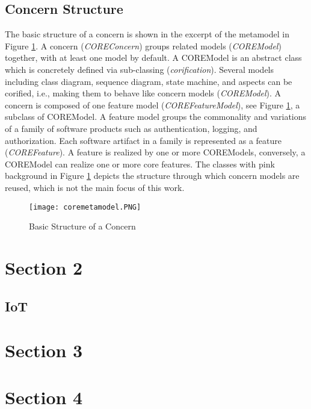\subsection{Concern Structure}
The basic structure of a concern is shown in the excerpt of the metamodel in Figure \ref{fig : core metamodel}. A concern (\textit{COREConcern}) groups related models (\textit{COREModel}) together, with at least one model by default. A COREModel is an abstract class which is concretely defined via sub-classing (\textit{corification}). Several models including class diagram, sequence diagram, state machine, and aspects can be corified, i.e., making them to behave like concern models (\textit{COREModel}).  A concern is composed of one feature model (\textit{COREFeatureModel}), see Figure \ref{fig : core metamodel}, a subclass of COREModel. A feature model groups the commonality and variations of a family of software products such as authentication, logging, and authorization. Each software artifact in a family is represented as a feature (\textit{COREFeature}). A feature is realized by one or more COREModels, conversely, a COREModel can realize one or more core features. The classes with pink background in Figure \ref{fig : core metamodel} depicts the structure through which concern models are reused, which is not the main focus of this work.

\begin{figure}
\texttt{[image: coremetamodel.PNG]}
	\caption{Basic Structure of a Concern}
	\label{fig : core metamodel}
\end{figure}

\section{Section 2}
\label{section2}

  
  
	\subsection{IoT}
	 
	 	 
	 

	
	


\section{Section 3}
\label{section3}


\section{Section 4}
\label{section4}
   

